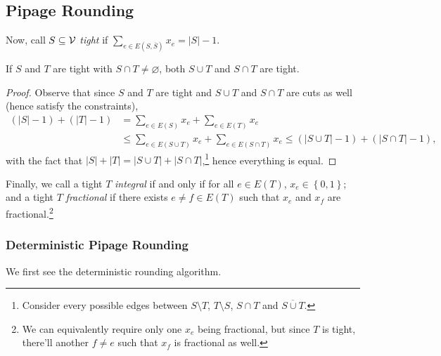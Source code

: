 \subsection{Pipage Rounding}
Now, call \(S\subseteq \mathcal{\MakeUppercase{v}} \) \emph{tight} if \(\sum_{e\in E(S, \overline{S})} x_e = \left\vert S \right\vert - 1 \).

\begin{lemma}[Uncrossing]\label{lma:uncrossing}
	If \(S\) and \(T\) are tight with \(S \cap T \neq \varnothing \), both \(S \cup T\) and \(S \cap T\) are tight.
\end{lemma}
\begin{proof}
	Observe that since \(S\) and \(T\) are tight and \(S\cup T\) and \(S \cap T\) are cuts as well (hence satisfy the constraints),
	\[
		\begin{split}
			(\left\vert S \right\vert - 1) + (\left\vert T \right\vert - 1)
			&= \sum_{e\in E(S)}x_e + \sum_{e\in E(T)} x_e\\
			&\leq \sum_{e\in E(S \cup T)}x_e  + \sum_{e\in E (S \cap T)} x_e
			\leq (\left\vert S \cup T \right\vert - 1) + ( \left\vert S \cap T \right\vert - 1),
		\end{split}
	\]
	with the fact that \(\left\vert S \right\vert + \left\vert T \right\vert = \left\vert S \cup T \right\vert + \left\vert S \cap T \right\vert\),\footnote{Consider every possible edges between \(S\setminus T\), \(T\setminus S\), \(S \cap T\) and \(\overline{S \cup T}\).} hence everything is equal.
\end{proof}

Finally, we call a tight \(T\) \emph{integral} if and only if for all \(e\in E(T)\), \(x_e\in \left\{ 0, 1 \right\} \); and a tight \(T\) \emph{fractional} if there exists \(e \neq f\in E(T)\) such that \(x_e\) and \(x_f\) are fractional.\footnote{We can equivalently require only one \(x_e\) being fractional, but since \(T\) is tight, there'll another \(f \neq e\) such that \(x_f\) is fractional as well.}

\subsubsection{Deterministic Pipage Rounding}
We first see the deterministic rounding algorithm.

